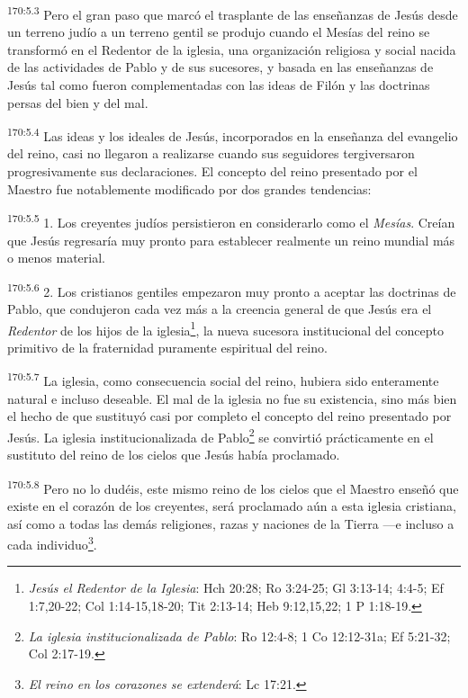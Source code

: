 \par
\textsuperscript{170:5.3} Pero el gran paso que marcó el trasplante de las enseñanzas de Jesús desde un terreno judío a un terreno gentil se produjo cuando el Mesías del reino se transformó en el Redentor de la iglesia, una organización religiosa y social nacida de las actividades de Pablo y de sus sucesores, y basada en las enseñanzas de Jesús tal como fueron complementadas con las ideas de Filón y las doctrinas persas del bien y del mal.

\par
\textsuperscript{170:5.4} Las ideas y los ideales de Jesús, incorporados en la enseñanza del evangelio del reino, casi no llegaron a realizarse cuando sus seguidores tergiversaron progresivamente sus declaraciones. El concepto del reino presentado por el Maestro fue notablemente modificado por dos grandes tendencias:

\par
\textsuperscript{170:5.5} 1. Los creyentes judíos persistieron en considerarlo como el \textit{Mesías}. Creían que Jesús regresaría muy pronto para establecer realmente un reino mundial más o menos material.

\par
\textsuperscript{170:5.6} 2. Los cristianos gentiles empezaron muy pronto a aceptar las doctrinas de Pablo, que condujeron cada vez más a la creencia general de que Jesús era el \textit{Redentor} de los hijos de la iglesia\footnote{\textit{Jesús el Redentor de la Iglesia}: Hch 20:28; Ro 3:24-25; Gl 3:13-14; 4:4-5; Ef 1:7,20-22; Col 1:14-15,18-20; Tit 2:13-14; Heb 9:12,15,22; 1 P 1:18-19.}, la nueva sucesora institucional del concepto primitivo de la fraternidad puramente espiritual del reino.

\par
\textsuperscript{170:5.7} La iglesia, como consecuencia social del reino, hubiera sido enteramente natural e incluso deseable. El mal de la iglesia no fue su existencia, sino más bien el hecho de que sustituyó casi por completo el concepto del reino presentado por Jesús. La iglesia institucionalizada de Pablo\footnote{\textit{La iglesia institucionalizada de Pablo}: Ro 12:4-8; 1 Co 12:12-31a; Ef 5:21-32; Col 2:17-19.} se convirtió prácticamente en el sustituto del reino de los cielos que Jesús había proclamado.

\par
\textsuperscript{170:5.8} Pero no lo dudéis, este mismo reino de los cielos que el Maestro enseñó que existe en el corazón de los creyentes, será proclamado aún a esta iglesia cristiana, así como a todas las demás religiones, razas y naciones de la Tierra ---e incluso a cada individuo\footnote{\textit{El reino en los corazones se extenderá}: Lc 17:21.}.

